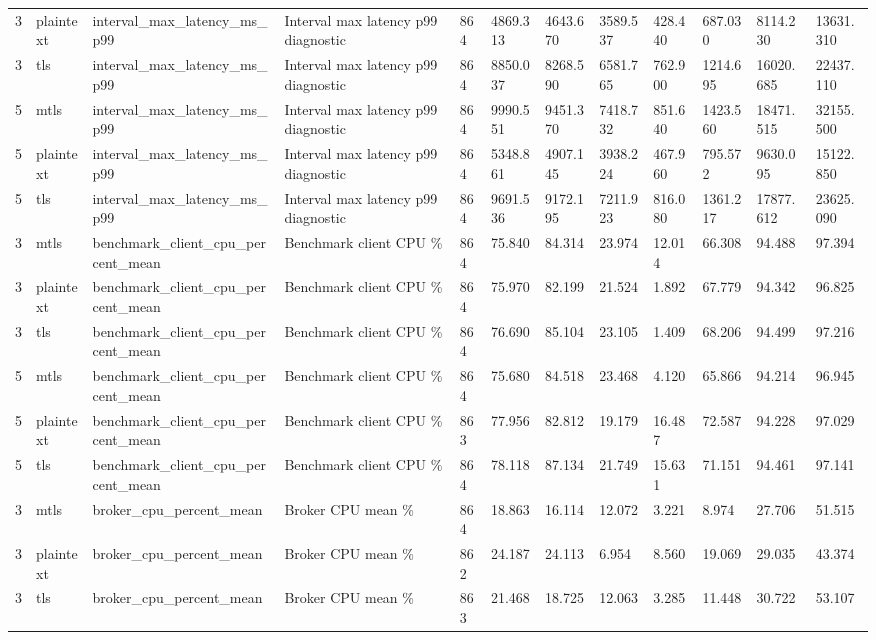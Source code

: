 \begin{longtable}{llllllllllll}
3 & plaintext & interval\_max\_latency\_ms\_p99 & Interval max latency p99 diagnostic & 864 & 4869.313 & 4643.670 & 3589.537 & 428.440 & 687.030 & 8114.230 & 13631.310 \\
3 & tls & interval\_max\_latency\_ms\_p99 & Interval max latency p99 diagnostic & 864 & 8850.037 & 8268.590 & 6581.765 & 762.900 & 1214.695 & 16020.685 & 22437.110 \\
5 & mtls & interval\_max\_latency\_ms\_p99 & Interval max latency p99 diagnostic & 864 & 9990.551 & 9451.370 & 7418.732 & 851.640 & 1423.560 & 18471.515 & 32155.500 \\
5 & plaintext & interval\_max\_latency\_ms\_p99 & Interval max latency p99 diagnostic & 864 & 5348.861 & 4907.145 & 3938.224 & 467.960 & 795.572 & 9630.095 & 15122.850 \\
5 & tls & interval\_max\_latency\_ms\_p99 & Interval max latency p99 diagnostic & 864 & 9691.536 & 9172.195 & 7211.923 & 816.080 & 1361.217 & 17877.612 & 23625.090 \\
3 & mtls & benchmark\_client\_cpu\_percent\_mean & Benchmark client CPU \% & 864 & 75.840 & 84.314 & 23.974 & 12.014 & 66.308 & 94.488 & 97.394 \\
3 & plaintext & benchmark\_client\_cpu\_percent\_mean & Benchmark client CPU \% & 864 & 75.970 & 82.199 & 21.524 & 1.892 & 67.779 & 94.342 & 96.825 \\
3 & tls & benchmark\_client\_cpu\_percent\_mean & Benchmark client CPU \% & 864 & 76.690 & 85.104 & 23.105 & 1.409 & 68.206 & 94.499 & 97.216 \\
5 & mtls & benchmark\_client\_cpu\_percent\_mean & Benchmark client CPU \% & 864 & 75.680 & 84.518 & 23.468 & 4.120 & 65.866 & 94.214 & 96.945 \\
5 & plaintext & benchmark\_client\_cpu\_percent\_mean & Benchmark client CPU \% & 863 & 77.956 & 82.812 & 19.179 & 16.487 & 72.587 & 94.228 & 97.029 \\
5 & tls & benchmark\_client\_cpu\_percent\_mean & Benchmark client CPU \% & 864 & 78.118 & 87.134 & 21.749 & 15.631 & 71.151 & 94.461 & 97.141 \\
3 & mtls & broker\_cpu\_percent\_mean & Broker CPU mean \% & 864 & 18.863 & 16.114 & 12.072 & 3.221 & 8.974 & 27.706 & 51.515 \\
3 & plaintext & broker\_cpu\_percent\_mean & Broker CPU mean \% & 862 & 24.187 & 24.113 & 6.954 & 8.560 & 19.069 & 29.035 & 43.374 \\
3 & tls & broker\_cpu\_percent\_mean & Broker CPU mean \% & 863 & 21.468 & 18.725 & 12.063 & 3.285 & 11.448 & 30.722 & 53.107 \\

\end{longtable}
